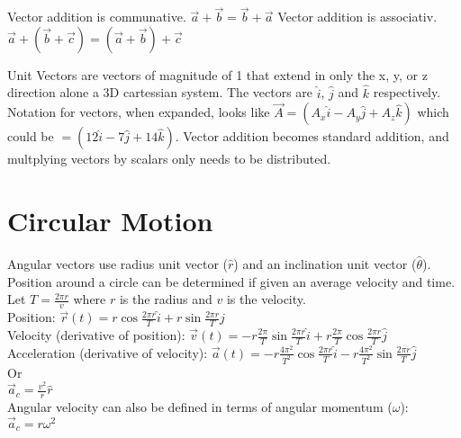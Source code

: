 \documentclass{article}
\begin{document}

Vector addition is communative. $\vec{a} + \vec{b} = \vec{b} + \vec{a}$
Vector addition is associativ. $\vec{a} + (\vec{b} + \vec{c}) = (\vec{a} + \vec{b}) + \vec{c}$

Unit Vectors are vectors of magnitude of 1 that extend in only the x, y, or z direction alone a 3D cartessian system. The vectors are $\hat{i}$, $\hat{j}$ and $\hat{k}$ respectively. Notation for vectors, when expanded, looks like $\vec{A} = (A_x\hat{i} - A_y\hat{j} + A_z\hat{k})$ which could be $=(12\hat{i} - 7\hat{j} + 14\hat{k})$. Vector addition becomes standard addition, and multplying vectors by scalars only needs to be distributed.

\section{Circular Motion}
Angular vectors use radius unit vector ($\hat{r}$) and an inclination unit vector ($\hat{\theta}$). Position around a circle can be determined if given an average velocity and time.\\
Let $T = \frac{2\pi r}{v}$ where $r$ is the radius and $v$ is the velocity.\\
Position: $\vec{r}(t) = r\cos{\frac{2\pi r}{T}}\hat{i} + r\sin{\frac{2\pi r}{T}}\hat{j}$\\
Velocity (derivative of position): $\vec{v}(t) = -r\frac{2\pi}{T}\sin{\frac{2\pi r}{T}}\hat{i} + r\frac{2\pi}{T}\cos{\frac{2\pi r}{T}}\hat{j}$\\
Acceleration (derivative of velocity): $\vec{a}(t) = -r\frac{4\pi^2}{T^2}\cos{\frac{2\pi r}{T}}\hat{i} - r\frac{4\pi^2}{T^2}\sin{\frac{2\pi r}{T}}\hat{j}$\\
Or\\
$\vec{a}_{c} = \frac{v^2}{r}\hat{r}$\\
Angular velocity can also be defined in terms of angular momentum ($\omega$): $\vec{a}_{c} = r{\omega}^2$
\end{document}
